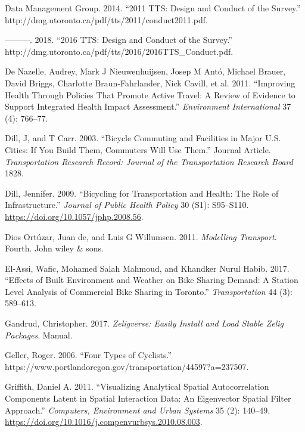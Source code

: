 \documentclass[smallextended]{svjour3}       %
\begin{document}
\leavevmode\hypertarget{ref-Dmg2014tts}{}%
Data Management Group. 2014. ``2011 TTS: Design and Conduct of the
Survey.'' http://dmg.utoronto.ca/pdf/tts/2011/conduct2011.pdf.

\leavevmode\hypertarget{ref-Dmg2018tts}{}%
---------. 2018. ``2016 TTS: Design and Conduct of the Survey.''
http://dmg.utoronto.ca/pdf/tts/2016/2016TTS\_Conduct.pdf.

\leavevmode\hypertarget{ref-deNazelle2011}{}%
De Nazelle, Audrey, Mark J Nieuwenhuijsen, Josep M Antó, Michael Brauer,
David Briggs, Charlotte Braun-Fahrlander, Nick Cavill, et al. 2011.
``Improving Health Through Policies That Promote Active Travel: A Review
of Evidence to Support Integrated Health Impact Assessment.''
\emph{Environment International} 37 (4): 766--77.

\leavevmode\hypertarget{ref-Dill2003}{}%
Dill, J, and T Carr. 2003. ``Bicycle Commuting and Facilities in Major
U.S. Cities: If You Build Them, Commuters Will Use Them.'' Journal
Article. \emph{Transportation Research Record: Journal of the
Transportation Research Board} 1828.

\leavevmode\hypertarget{ref-Dill2009}{}%
Dill, Jennifer. 2009. ``Bicycling for Transportation and Health: The
Role of Infrastructure.'' \emph{Journal of Public Health Policy} 30
(S1): S95--S110. \url{https://doi.org/10.1057/jphp.2008.56}.

\leavevmode\hypertarget{ref-deDios2011Modelling}{}%
Dios Ortúzar, Juan de, and Luis G Willumsen. 2011. \emph{Modelling
Transport}. Fourth. John wiley \& sons.

\leavevmode\hypertarget{ref-elAssi2017effects}{}%
El-Assi, Wafic, Mohamed Salah Mahmoud, and Khandker Nurul Habib. 2017.
``Effects of Built Environment and Weather on Bike Sharing Demand: A
Station Level Analysis of Commercial Bike Sharing in Toronto.''
\emph{Transportation} 44 (3): 589--613.

\leavevmode\hypertarget{ref-Gandrud2017}{}%
Gandrud, Christopher. 2017. \emph{Zeligverse: Easily Install and Load
Stable Zelig Packages}. Manual.

\leavevmode\hypertarget{ref-Geller2006}{}%
Geller, Roger. 2006. ``Four Types of Cyclists.''
https://www.portlandoregon.gov/transportation/44597?a=237507.

\leavevmode\hypertarget{ref-Griffith2011}{}%
Griffith, Daniel A. 2011. ``Visualizing Analytical Spatial
Autocorrelation Components Latent in Spatial Interaction Data: An
Eigenvector Spatial Filter Approach.'' \emph{Computers, Environment and
Urban Systems} 35 (2): 140--49.
\url{https://doi.org/10.1016/j.compenvurbsys.2010.08.003}.
\end{document}
